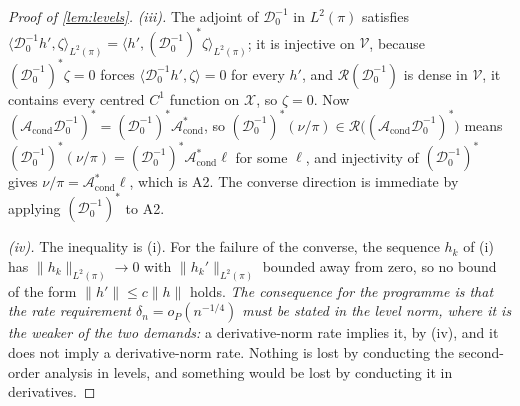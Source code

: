 \begin{proof}[Proof of \cref{lem:levels}]
\emph{(iii).} The adjoint of $\mathcal D^{-1}_0$ in $L^{2}(\pi)$ satisfies
$\langle\mathcal D^{-1}_0h',\zeta\rangle_{L^{2}(\pi)}=\langle h',(\mathcal D^{-1}_0)^{\ast}\zeta\rangle_{L^{2}(\pi)}$;
it is injective on $\mathcal V$, because $(\mathcal D^{-1}_0)^{\ast}\zeta=0$ forces
$\langle\mathcal D^{-1}_0h',\zeta\rangle=0$ for every $h'$, and $\mathcal R(\mathcal D^{-1}_0)$ is dense in
$\mathcal V$, it contains every centred $C^{1}$ function on $\mathcal X$, so $\zeta=0$. Now
$(\mathcal A_{\mathrm{cond}}\mathcal D^{-1}_0)^{\ast}=(\mathcal D^{-1}_0)^{\ast}\mathcal A^\ast_{\mathrm{cond}}$,
so
$(\mathcal D^{-1}_0)^{\ast}(\nu/\pi)\in\mathcal R\big((\mathcal A_{\mathrm{cond}}\mathcal D^{-1}_0)^{\ast}\big)$
means $(\mathcal D^{-1}_0)^{\ast}(\nu/\pi)=(\mathcal D^{-1}_0)^{\ast}\mathcal A^\ast_{\mathrm{cond}}\ell$
for some $\ell$, and injectivity of $(\mathcal D^{-1}_0)^{\ast}$ gives
$\nu/\pi=\mathcal A^\ast_{\mathrm{cond}}\ell$, which is A2. The converse direction is immediate by
applying $(\mathcal D^{-1}_0)^{\ast}$ to A2.

\emph{(iv).} The inequality is (i). For the failure of the converse, the sequence $h_k$ of (i) has
$\|h_k\|_{L^{2}(\pi)}\to0$ with $\|h_k'\|_{L^{2}(\pi)}$ bounded away from zero, so no bound of the form
$\|h'\|\le c\|h\|$ holds. \emph{The consequence for the programme is that the rate requirement
$\delta_n=o_P(n^{-1/4})$ must be stated in the level norm, where it is the weaker of the two demands:} a
derivative-norm rate implies it, by (iv), and it does not imply a derivative-norm rate. Nothing is lost
by conducting the second-order analysis in levels, and something would be lost by conducting it in
derivatives.
\end{proof}

